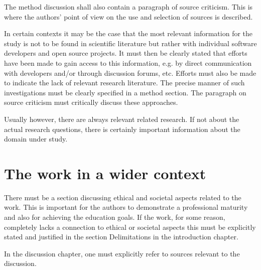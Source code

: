 The method discussion shall also contain a paragraph of
source criticism. This is where the authors’ point of view on
the use and selection of sources is described.

In certain contexts it may be the case that the most relevant
information for the study is not to be found in scientific
literature but rather with individual software developers and
open source projects. It must then be clearly stated that
efforts have been made to gain access to this information,
e.g. by direct communication with developers and/or through
discussion forums, etc. Efforts must also be made to indicate
the lack of relevant research literature. The precise manner
of such investigations must be clearly specified in a method
section. The paragraph on source criticism must critically
discuss these approaches.

Usually however, there are always relevant related research.
If not about the actual research questions, there is certainly
important information about the domain under study.

\section{The work in a wider context}
\label{sec:work-wider-context}

There must be a section discussing ethical and societal
aspects related to the work. This is important for the authors
to demonstrate a professional maturity and also for achieving
the education goals. If the work, for some reason, completely
lacks a connection to ethical or societal aspects this must be
explicitly stated and justified in the section Delimitations in
the introduction chapter.

In the discussion chapter, one must explicitly refer to sources
relevant to the discussion.

